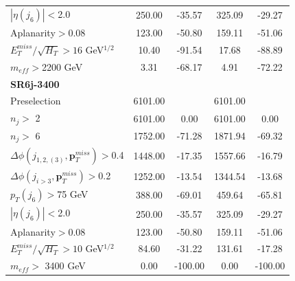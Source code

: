 \documentclass[a4paper,11pt]{article}
\begin{document}
\begin{table}[h]
\begin{tabular}{ | l | c c c c | }
	$|\eta(j_6)|<$2.0&250.00&-35.57&325.09&-29.27
	\\
	Aplanarity$>$0.08&123.00&-50.80&159.11&-51.06
	\\
	$E_T^{miss}/\sqrt{H_T}>16 $ GeV$^{1/2}$&10.40&-91.54&17.68&-88.89
	\\
	$m_{eff}>$2200 GeV&3.31&-68.17&4.91&-72.22
	\\ \hline
			\multicolumn{5}{|l|}{\textbf{SR6j-3400}} \\ \hline		
	Preselection&6101.00&&6101.00&
	\\
	$n_j>$ 2&6101.00&0.00&6101.00&0.00
	\\
	$n_j>$ 6&1752.00&-71.28&1871.94&-69.32
	\\
	$\Delta \phi(j_{1,2,(3)},\mathbf{p}_T^{miss})>$0.4&1448.00&-17.35&1557.66&-16.79
	\\
	$\Delta \phi(j_{i>3},\mathbf{p}_T^{miss})>$0.2&1252.00&-13.54&1344.54&-13.68
	\\
	$p_T(j_6)>$75 GeV&388.00&-69.01&459.64&-65.81
	\\
	$|\eta(j_6)|<$2.0&250.00&-35.57&325.09&-29.27
	\\
	Aplanarity$>$0.08&123.00&-50.80&159.11&-51.06
	\\
	$E_T^{miss}/\sqrt{H_T}>10 $ GeV$^{1/2}$&84.60&-31.22&131.61&-17.28
	\\
	$m_{eff}>$ 3400 GeV&0.00&-100.00&0.00&-100.00
	\\ 
	
	
				\bottomrule \bottomrule
\end{tabular}
\end{table}			
				
\end{document}
